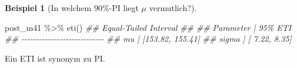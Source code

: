 \documentclass[
  a4paper,
  DIV=11]{scrreprt}
\newenvironment{Shaded}{\begin{snugshade}}{\end{snugshade}}
\newcommand{\DocumentationTok}[1]{\textcolor[rgb]{0.37,0.37,0.37}{\textit{#1}}}
\newcommand{\FunctionTok}[1]{\textcolor[rgb]{0.28,0.35,0.67}{#1}}
\newcommand{\NormalTok}[1]{\textcolor[rgb]{0.00,0.23,0.31}{#1}}
\newcommand{\SpecialCharTok}[1]{\textcolor[rgb]{0.37,0.37,0.37}{#1}}
\theoremstyle{definition}
\newtheorem{example}{Beispiel}[chapter]
\theoremstyle{remark}
\begin{document}
\leavevmode{}%
\begin{example}[In welchem 90\%-PI liegt \(\mu\)
vermutlich?]\label{exm-kung4}

\begin{Shaded}
\begin{Highlighting}[]
\NormalTok{post\_m41 }\SpecialCharTok{\%\textgreater{}\%} 
  \FunctionTok{eti}\NormalTok{()}
\DocumentationTok{\#\# Equal{-}Tailed Interval}
\DocumentationTok{\#\# }
\DocumentationTok{\#\# Parameter |          95\% ETI}
\DocumentationTok{\#\# {-}{-}{-}{-}{-}{-}{-}{-}{-}{-}{-}{-}{-}{-}{-}{-}{-}{-}{-}{-}{-}{-}{-}{-}{-}{-}{-}{-}}
\DocumentationTok{\#\# mu        | [153.82, 155.41]}
\DocumentationTok{\#\# sigma     | [  7.22,   8.35]}
\end{Highlighting}
\end{Shaded}

Ein ETI ist synonym zu PI.

\end{example}
\end{document}

